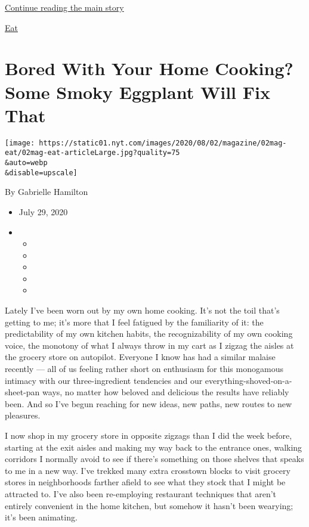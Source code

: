 \protect\hyperlink{after-sponsor}{Continue reading the main story}

\href{/column/magazine-eat}{Eat}

\hypertarget{bored-with-your-home-cooking-some-smoky-eggplant-will-fix-that}{%
\section{Bored With Your Home Cooking? Some Smoky Eggplant Will Fix
That}\label{bored-with-your-home-cooking-some-smoky-eggplant-will-fix-that}}

\texttt{[image: https://static01.nyt.com/images/2020/08/02/magazine/02mag-eat/02mag-eat-articleLarge.jpg?quality=75\\\&auto=webp\\\&disable=upscale]}

By Gabrielle Hamilton

\begin{itemize}
\item
  July 29, 2020
\item
  \begin{itemize}
  \item
  \item
  \item
  \item
  \item
  \end{itemize}
\end{itemize}

Lately I've been worn out by my own home cooking. It's not the toil
that's getting to me; it's more that I feel fatigued by the familiarity
of it: the predictability of my own kitchen habits, the recognizability
of my own cooking voice, the monotony of what I always throw in my cart
as I zigzag the aisles at the grocery store on autopilot. Everyone I
know has had a similar malaise recently --- all of us feeling rather
short on enthusiasm for this monogamous intimacy with our
three-ingredient tendencies and our everything-shoved-on-a-sheet-pan
ways, no matter how beloved and delicious the results have reliably
been. And so I've begun reaching for new ideas, new paths, new routes to
new pleasures.

I now shop in my grocery store in opposite zigzags than I did the week
before, starting at the exit aisles and making my way back to the
entrance ones, walking corridors I normally avoid to see if there's
something on those shelves that speaks to me in a new way. I've trekked
many extra crosstown blocks to visit grocery stores in neighborhoods
farther afield to see what they stock that I might be attracted to. I've
also been re-employing restaurant techniques that aren't entirely
convenient in the home kitchen, but somehow it hasn't been wearying;
it's been animating.

